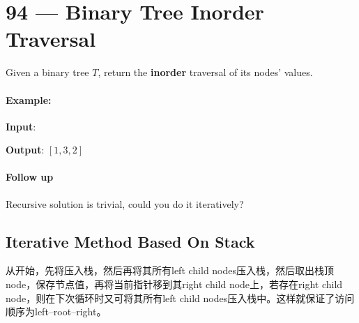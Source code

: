 \section{94 --- Binary Tree Inorder Traversal}
Given a binary tree $T$, return the \textbf{inorder} traversal of its nodes' values.
\paragraph{Example:}
\begin{flushleft}
\textbf{Input}: 
\begin{figure}[H]
\end{figure}
\textbf{Output}: $[1,3,2]$
\end{flushleft}
\paragraph{Follow up}
\begin{flushleft}
Recursive solution is trivial, could you do it iteratively?
\end{flushleft}
\subsection{Iterative Method Based On Stack}
从开始，先将压入栈，然后再将其所有left child nodes压入栈，然后取出栈顶node，保存节点值，再将当前指针移到其right child node上，若存在right child node，则在下次循环时又可将其所有left child nodes压入栈中。这样就保证了访问顺序为left--root--right。
